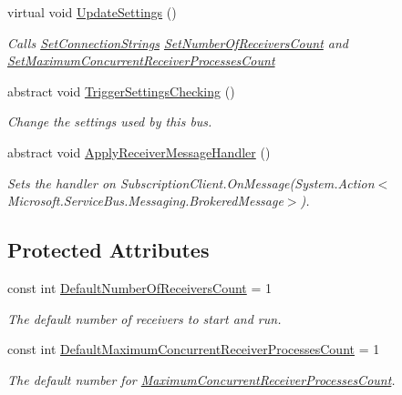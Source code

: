 \begin{DoxyCompactItemize}
virtual void \hyperlink{classCqrs_1_1Azure_1_1ServiceBus_1_1AzureBus_aa41ae78c1e674cfd9316c573ca5d1bab_aa41ae78c1e674cfd9316c573ca5d1bab}{Update\+Settings} ()
\begin{DoxyCompactList}\small\item\em Calls \hyperlink{classCqrs_1_1Azure_1_1ServiceBus_1_1AzureBus_a8a1be9145b0a92c0037ef1b8b4cc79d9_a8a1be9145b0a92c0037ef1b8b4cc79d9}{Set\+Connection\+Strings} \hyperlink{classCqrs_1_1Azure_1_1ServiceBus_1_1AzureBus_a7633f211059ee45dfb907b16a955a790_a7633f211059ee45dfb907b16a955a790}{Set\+Number\+Of\+Receivers\+Count} and \hyperlink{classCqrs_1_1Azure_1_1ServiceBus_1_1AzureBus_a60cbe46aa3e60528dbd7e07be5132132_a60cbe46aa3e60528dbd7e07be5132132}{Set\+Maximum\+Concurrent\+Receiver\+Processes\+Count} \end{DoxyCompactList}\item 
abstract void \hyperlink{classCqrs_1_1Azure_1_1ServiceBus_1_1AzureBus_ae501f84c4983bfa3b2ae4551749ac998_ae501f84c4983bfa3b2ae4551749ac998}{Trigger\+Settings\+Checking} ()
\begin{DoxyCompactList}\small\item\em Change the settings used by this bus. \end{DoxyCompactList}\item 
abstract void \hyperlink{classCqrs_1_1Azure_1_1ServiceBus_1_1AzureBus_aad25a164e9e526c59d8ef98635c98095_aad25a164e9e526c59d8ef98635c98095}{Apply\+Receiver\+Message\+Handler} ()
\begin{DoxyCompactList}\small\item\em Sets the handler on Subscription\+Client.\+On\+Message(\+System.\+Action$<$\+Microsoft.\+Service\+Bus.\+Messaging.\+Brokered\+Message$>$). \end{DoxyCompactList}\end{DoxyCompactItemize}
\subsection*{Protected Attributes}
\begin{DoxyCompactItemize}
\item 
const int \hyperlink{classCqrs_1_1Azure_1_1ServiceBus_1_1AzureBus_a19642a14d6cf036cbbdb68b9ba7e635d_a19642a14d6cf036cbbdb68b9ba7e635d}{Default\+Number\+Of\+Receivers\+Count} = 1
\begin{DoxyCompactList}\small\item\em The default number of receivers to start and run. \end{DoxyCompactList}\item 
const int \hyperlink{classCqrs_1_1Azure_1_1ServiceBus_1_1AzureBus_a12c3d07b7ad1836e85a449e6adc8b5df_a12c3d07b7ad1836e85a449e6adc8b5df}{Default\+Maximum\+Concurrent\+Receiver\+Processes\+Count} = 1
\begin{DoxyCompactList}\small\item\em The default number for \hyperlink{classCqrs_1_1Azure_1_1ServiceBus_1_1AzureBus_a6b517888d91c6a5b026cb5857e75a04f_a6b517888d91c6a5b026cb5857e75a04f}{Maximum\+Concurrent\+Receiver\+Processes\+Count}. \end{DoxyCompactList}\end{DoxyCompactItemize}
